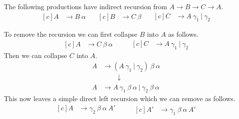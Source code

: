 The following productions have indirect recursion from $A \rightarrow B \rightarrow C \rightarrow A$.
\begin{equation*}
    \begin{aligned}[c]
        A &\rightarrow B\ \alpha
    \end{aligned}
    \quad 
    \begin{aligned}[c]
        B &\rightarrow C\ \beta
    \end{aligned}
    \quad
    \begin{aligned}[c]
        C &\rightarrow A\ \gamma_1\ |\  \gamma_2
    \end{aligned}
\end{equation*}

To remove the recursion we can first collapse $B$ into $A$ as follows.
\begin{equation*}
    \begin{aligned}[c]
        A &\rightarrow C\ \beta\ \alpha
    \end{aligned}
    \qquad 
    \begin{aligned}[c]
        C &\rightarrow A\ \gamma_1\ |\ \gamma_2
    \end{aligned}
\end{equation*}
Then we can collapse $C$ into $A$.
\begin{align*}
    A &\rightarrow (A\ \gamma_1\ |\  \gamma_2)\ \beta\ \alpha\\
    &\ \ \ \ \ \ \ \ \ \ \downarrow\\
    A &\rightarrow A\ \gamma_1\ \beta\ \alpha\ |\ \gamma_2\ \beta\ \alpha
\end{align*}
This now leaves a simple direct left recursion which we can remove as follows.
\begin{equation*}
    \begin{aligned}[c]
        A &\rightarrow \gamma_2\ \beta\ \alpha\ A'\\
    \end{aligned}
    \qquad 
    \begin{aligned}[c]
        A' &\rightarrow \gamma_1\ \beta\ \alpha\ A'
    \end{aligned}
\end{equation*}